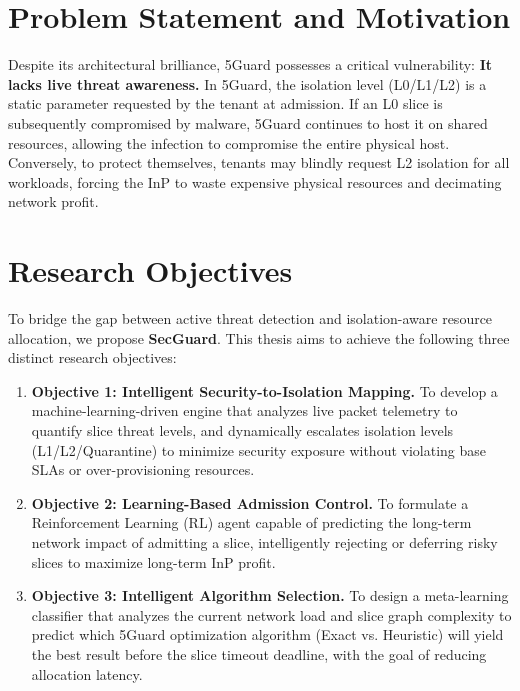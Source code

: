 \section{Problem Statement and Motivation}\label{sec:intro-problem}
Despite its architectural brilliance, 5Guard possesses a critical vulnerability: \textbf{It lacks live threat awareness.} In 5Guard, the isolation level (L0/L1/L2) is a static parameter requested by the tenant at admission. If an L0 slice is subsequently compromised by malware, 5Guard continues to host it on shared resources, allowing the infection to compromise the entire physical host. Conversely, to protect themselves, tenants may blindly request L2 isolation for all workloads, forcing the InP to waste expensive physical resources and decimating network profit.

\section{Research Objectives}\label{sec:intro-objectives}
To bridge the gap between active threat detection and isolation-aware resource allocation, we propose \textbf{SecGuard}. This thesis aims to achieve the following three distinct research objectives:

\begin{enumerate}
    \item \textbf{Objective 1: Intelligent Security-to-Isolation Mapping.} To develop a machine-learning-driven engine that analyzes live packet telemetry to quantify slice threat levels, and dynamically escalates isolation levels (L1/L2/Quarantine) to minimize security exposure without violating base SLAs or over-provisioning resources.
    \item \textbf{Objective 2: Learning-Based Admission Control.} To formulate a Reinforcement Learning (RL) agent capable of predicting the long-term network impact of admitting a slice, intelligently rejecting or deferring risky slices to maximize long-term InP profit.
    \item \textbf{Objective 3: Intelligent Algorithm Selection.} To design a meta-learning classifier that analyzes the current network load and slice graph complexity to predict which 5Guard optimization algorithm (Exact vs. Heuristic) will yield the best result before the slice timeout deadline, with the goal of reducing allocation latency.
\end{enumerate}

